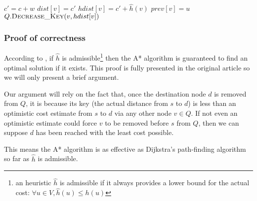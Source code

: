 \begin{center}
\begin{algorithm}[H]
\begin{minipage}[t]{0.49\linewidth}
\begin{algorithmic}[1]
                          \EndIf
                            \State $c' = c + w$
                                \State $dist[v] = c'$
                                \State $hdist[v] = c'+\hat{h}(v)$
                                \State $prev[v] = u$
                                \State $Q.\Call{Decrease\_Key}{v, hdist[v]}$
                            \EndIf
                        \EndFor
                    \EndWhile
                \EndFunction
            \end{algorithmic}
        \end{minipage}
    \end{algorithm}
\end{center}
\subsubsection{Proof of correctness}
According to \cite{Astar}, if $\hat{h}$ is admissible\footnote{an heuristic $\hat{h}$ is admissible if it always provides a lower bound for the actual cost: $\forall u \in V, \hat{h}(u) \leq h(u)$} then the A* algorithm is guaranteed to find an optimal solution if it exists. This proof is fully presented in the original article so we will only present a brief argument.\par
Our argument will rely on the fact that, once the destination node $d$ is removed from $Q$, it is because its key (the actual distance from $s$ to $d$) is less than an optimistic cost estimate from $s$ to $d$ via any other node $v \in Q$. If not even an optimistic estimate could force $v$ to be removed before $s$ from $Q$, then we can suppose $d$ has been reached with the least cost possible.\par
This means the A* algorithm is as effective as Dijkstra's path-finding algorithm so far as $\hat{h}$ is admissible.
